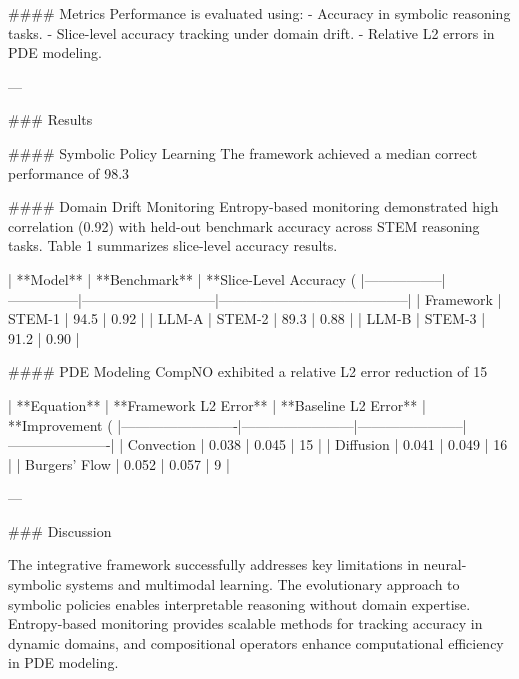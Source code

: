 #### Metrics
Performance is evaluated using:
- Accuracy in symbolic reasoning tasks.
- Slice-level accuracy tracking under domain drift.
- Relative L2 errors in PDE modeling.

---

### Results

#### Symbolic Policy Learning
The framework achieved a median correct performance of 98.3%

#### Domain Drift Monitoring
Entropy-based monitoring demonstrated high correlation (0.92) with held-out benchmark accuracy across STEM reasoning tasks. Table 1 summarizes slice-level accuracy results.

| **Model**      | **Benchmark** | **Slice-Level Accuracy (%
|-----------------|---------------|-----------------------------|-----------------------------------------|
| Framework       | STEM-1        | 94.5                        | 0.92                                    |
| LLM-A           | STEM-2        | 89.3                        | 0.88                                    |
| LLM-B           | STEM-3        | 91.2                        | 0.90                                    |

#### PDE Modeling
CompNO exhibited a relative L2 error reduction of 15%

| **Equation**           | **Framework L2 Error** | **Baseline L2 Error** | **Improvement (%
|-------------------------|------------------------|-----------------------|----------------------|
| Convection             | 0.038                 | 0.045                | 15                   |
| Diffusion              | 0.041                 | 0.049                | 16                   |
| Burgers' Flow          | 0.052                 | 0.057                | 9                    |

---

### Discussion

The integrative framework successfully addresses key limitations in neural-symbolic systems and multimodal learning. The evolutionary approach to symbolic policies enables interpretable reasoning without domain expertise. Entropy-based monitoring provides scalable methods for tracking accuracy in dynamic domains, and compositional operators enhance computational efficiency in PDE modeling.

